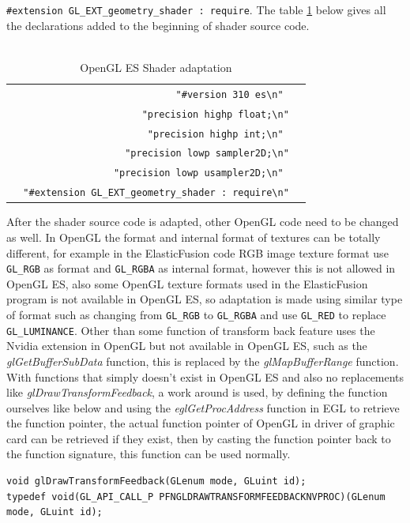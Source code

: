 \documentclass[12pt,twoside]{article}
\begin{document}
\verb|#extension GL_EXT_geometry_shader : require|. The table \ref{table:OpenGL ES Shader} below gives all the declarations added to the beginning of shader source code.\\
\\
\begin{table}
\centering
\caption{OpenGL ES Shader adaptation}
\label{table:OpenGL ES Shader}
\begin{tabular}{|r|l|}
  \hline
  \verb| "#version 310 es\n" |\\
  \verb| "precision highp float;\n"| \\
  \verb|   "precision highp int;\n" |\\
   \verb|    "precision lowp sampler2D;\n"| \\
   \verb|  "precision lowp usampler2D;\n" |\\
 \verb|  "#extension GL_EXT_geometry_shader : require\n"| \\
    \hline
\end{tabular}
\end{table}
After the shader source code is adapted, other OpenGL code need to be changed as well. In OpenGL the format and internal format of textures can be totally different, for example in the ElasticFusion code RGB image texture format use \verb|GL_RGB| as format and \verb|GL_RGBA| as internal format, however this is not allowed in OpenGL ES, also some OpenGL texture formats used in the ElasticFusion program is not available in OpenGL ES, so adaptation is made using similar type of format such as changing from \verb|GL_RGB| to \verb|GL_RGBA| and use \verb|GL_RED| to replace \verb|GL_LUMINANCE|. Other than some function of transform back feature uses the Nvidia extension in OpenGL but not available in OpenGL ES, such as the \textit{glGetBufferSubData} function, this is replaced by the \textit{glMapBufferRange} function. With functions that simply doesn't exist in OpenGL ES and also no replacements like \textit{glDrawTransformFeedback}, a work around is used, by defining the function ourselves like below and using the \textit{eglGetProcAddress} function in EGL to retrieve the function pointer, the actual function pointer of OpenGL in driver of graphic card can be retrieved if they exist, then by casting the function pointer back to the function signature, this function can be used normally.\\
\begin{lstlisting}
void glDrawTransformFeedback(GLenum mode, GLuint id);
typedef void(GL_API_CALL_P PFNGLDRAWTRANSFORMFEEDBACKNVPROC)(GLenum mode, GLuint id);
\end{lstlisting}
\end{document}
